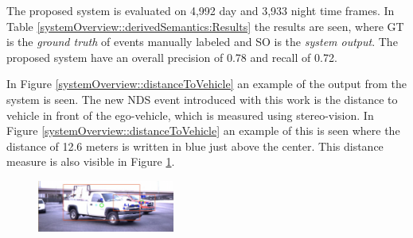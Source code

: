 \begin{multicols}{2}   
The proposed system is evaluated on 4,992 day and 3,933 night time frames. In Table \ref{systemOverview::derivedSemantics:Results} the results are seen, where GT is the \textit{ground truth} of events manually labeled and SO is the \textit{system output}. The proposed system have an overall precision of 0.78 and recall of 0.72.
\begin{center}
\end{center}
In Figure \ref{systemOverview::distanceToVehicle} an example of the output from the system is seen. %
The new NDS event introduced with this work is the distance to vehicle in front of the ego-vehicle, which is measured using stereo-vision. In Figure \ref{systemOverview::distanceToVehicle} an example of this is seen where the distance of 12.6 meters is written in blue just above the center. This distance measure is also visible in Figure \ref{systemOverview::occludedVehicleDetected}.
\begin{figure}[H]
  \centering
  \includegraphics[width=0.4\textwidth]{text/figures/lefttrun2cars.png}
  \label{systemOverview::occludedVehicleDetected}
\end{figure}


\end{multicols}
